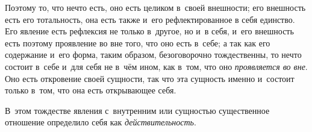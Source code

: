 Поэтому то, что нечто есть, оно есть целиком в~своей внешности; его
внешность есть его тотальность, она есть также и~его рефлектированное в
себя единство. Его явление есть рефлексия не только в~другое, но и~в себя,
и~его внешность есть поэтому проявление во вне того, что оно есть в~себе; а
так как его содержание и~его форма, таким образом, безоговорочно
тождественны, то нечто состоит в~себе и~для себя не в~чём ином, как в~том,
что оно {\em проявляется во вне}. Оно есть откровение
своей сущности, так что эта сущность именно и~состоит только в~том, что она
есть открывающее себя.

В~этом тождестве явления с~внутренним или сущностью существенное отношение
определило себя как {\em действительность}.

